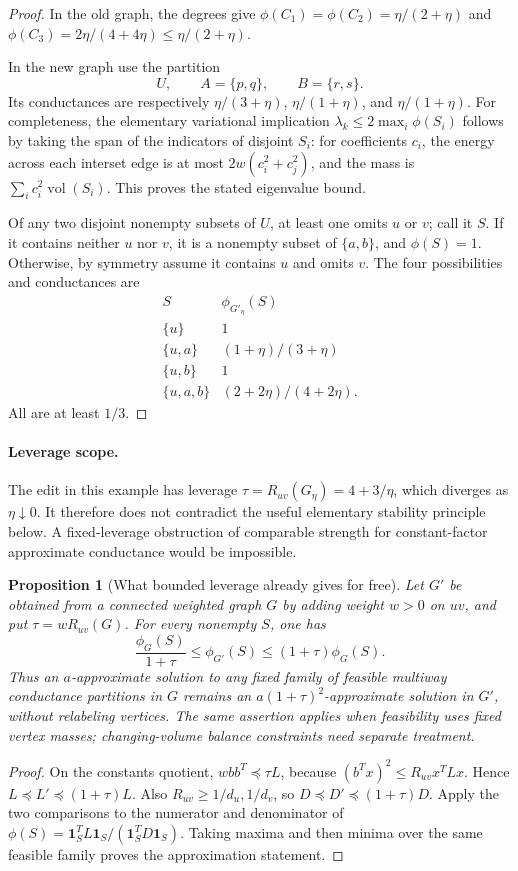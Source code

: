 \documentclass[11pt]{article}
\newtheorem{proposition}{Proposition}
\newcommand{\vol}{\operatorname{vol}}
\begin{document}
\begin{proof}
In the old graph, the degrees give
$\phi(C_1)=\phi(C_2)=\eta/(2+\eta)$ and
$\phi(C_3)=2\eta/(4+4\eta)\le\eta/(2+\eta)$.

In the new graph use the partition
\[
 U,\qquad A=\{p,q\},\qquad B=\{r,s\}.
\]
Its conductances are respectively
$\eta/(3+\eta)$, $\eta/(1+\eta)$, and $\eta/(1+\eta)$.
For completeness, the elementary variational implication
$\lambda_k\le2\max_i\phi(S_i)$ follows by taking the span of the
indicators of disjoint $S_i$: for coefficients $c_i$, the energy across
each interset edge is at most $2w(c_i^2+c_j^2)$, and the mass is
$\sum_i c_i^2\vol(S_i)$. This proves the stated eigenvalue bound.

Of any two disjoint nonempty subsets of $U$, at least one omits $u$ or
$v$; call it $S$. If it contains neither $u$ nor $v$, it is a nonempty
subset of $\{a,b\}$, and $\phi(S)=1$.
Otherwise, by symmetry assume it contains $u$ and omits $v$. The four
possibilities and conductances are
\[
 \begin{array}{c|c}
 S&\phi_{G'_\eta}(S)\\\hline
 \{u\}&1\\
 \{u,a\}&(1+\eta)/(3+\eta)\\
 \{u,b\}&1\\
 \{u,a,b\}&(2+2\eta)/(4+2\eta).
 \end{array}
\]
All are at least $1/3$.
\end{proof}

\paragraph{Leverage scope.}
The edit in this example has leverage
$\tau=R_{uv}(G_\eta)=4+3/\eta$, which diverges as $\eta\downarrow0$.
It therefore does not contradict the useful elementary stability
principle below. A fixed-leverage obstruction of comparable strength
for constant-factor approximate conductance would be impossible.

\begin{proposition}[What bounded leverage already gives for free]
Let $G'$ be obtained from a connected weighted graph $G$ by adding
weight $w>0$ on $uv$, and put $\tau=wR_{uv}(G)$. For every nonempty
$S$, one has
\[
 \frac{\phi_G(S)}{1+\tau}\le\phi_{G'}(S)
 \le(1+\tau)\phi_G(S).
\]
Thus an $a$-approximate solution to any fixed family of feasible
multiway conductance partitions in $G$ remains an
$a(1+\tau)^2$-approximate solution in $G'$, without relabeling vertices.
The same assertion applies when feasibility uses fixed vertex masses;
changing-volume balance constraints need separate treatment.
\end{proposition}
\begin{proof}
On the constants quotient,
$wbb^T\preceq\tau L$, because
$(b^Tx)^2\le R_{uv}x^TLx$. Hence
$L\preceq L'\preceq(1+\tau)L$.
Also $R_{uv}\ge1/d_u,1/d_v$, so
$D\preceq D'\preceq(1+\tau)D$.
Apply the two comparisons to the numerator and denominator of
$\phi(S)=\mathbf1_S^TL\mathbf1_S/(\mathbf1_S^TD\mathbf1_S)$.
Taking maxima and then minima over the same feasible family proves
the approximation statement.
\end{proof}
\end{document}
